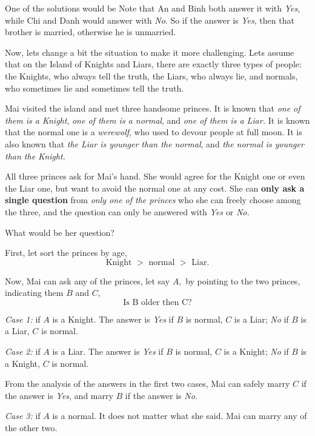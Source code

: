 \documentclass{article}
\begin{document}
\begin{soln}
    One of the solutions would be 
    Note that An and Binh both answer it with \textit{Yes},
    while Chi and Danh would answer with \textit{No}.
    So if the answer is \textit{Yes}, then that brother is married, otherwise he is unmarried.
\end{soln}

Now, lets change a bit the situation to make it more challenging.
Lets assume that on the Island of Knights and Liars,
there are exactly three types of people:
the Knights, who always tell the truth, the Liars, who always lie,
and normals, who sometimes lie and sometimes tell the truth.

\begin{example*}
    
    Mai visited the island and met three handsome princes.
    It is known that \textit{one of them is a Knight}, \textit{one of them is a normal},
    and \textit{one of them is a Liar.}
    It is known that the normal one is a \textit{werewolf},
    who used to devour people at full moon.
    It is also known that \textit{the Liar is younger than the normal},
    and \textit{the normal is younger than the Knight.}
    
    All three princes ask for Mai's hand.
    She would agree for the Knight one or even the Liar one, but want to avoid the normal one at any cost.
    She can \textbf{only ask a single question} from \textit{only one of the princes}
    who she can freely choose among the three,
    and the question can only be answered with \textit{Yes} or \textit{No.}

    What would be her question?
\end{example*}

\begin{soln}
    First, let sort the princes by age, 
    \[ 
        \text{Knight\ } > \text{\ normal\ } > \text{\ Liar}.
    \]
    
    Now, Mai can ask any of the princes, let say $A,$ by pointing to the two princes,
    indicating them $B$ and $C,$ 
    \[
        \boxed{\text{Is B older then C?}}
    \]

    \textit{Case 1:} if $A$ is a Knight.
    The answer is \textit{Yes} if $B$ is normal, $C$ is a Liar;
    \textit{No} if $B$ is a Liar, $C$ is normal.

    \textit{Case 2:} if $A$ is a Liar.
    The answer is \textit{Yes} if $B$ is normal, $C$ is a Knight;
    \textit{No} if $B$ is a Knight, $C$ is normal.

    From the analysis of the answers in the first two cases,
    Mai can safely marry $C$ if the answer is \textit{Yes},
    and marry $B$ if the answer is \textit{No.} 

    \textit{Case 3:} if $A$ is a normal. It does not matter what she said.
    Mai can marry any of the other two.
\end{soln}
\end{document}
